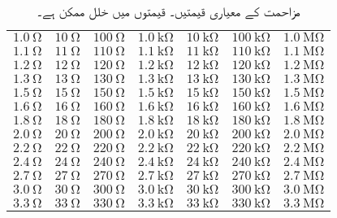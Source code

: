 \begin{table}
\caption{مزاحمت کے معیاری قیمتیں۔ قیمتوں میں  خلل ممکن ہے۔}
\centering
\begin{tabular}{l l l l l l l}
$\SI{1.0}{\ohm} $& $\SI{10}{\ohm}$ & $\SI{100}{\ohm}$ & $\SI{1.0}{\kilo\ohm}$ &$\SI{10}{\kilo\ohm} $& $\SI{100}{\kilo\ohm}$ & $\SI{1.0}{\mega\ohm}$\\
$\SI{1.1}{\ohm} $& $\SI{11}{\ohm}$ & $\SI{110}{\ohm}$ & $\SI{1.1}{\kilo\ohm}$ &$\SI{11}{\kilo\ohm} $& $\SI{110}{\kilo\ohm}$ & $\SI{1.1}{\mega\ohm}$\\
$\SI{1.2}{\ohm} $& $\SI{12}{\ohm}$ & $\SI{120}{\ohm}$ & $\SI{1.2}{\kilo\ohm}$ &$\SI{12}{\kilo\ohm} $& $\SI{120}{\kilo\ohm}$ & $\SI{1.2}{\mega\ohm}$\\
$\SI{1.3}{\ohm} $& $\SI{13}{\ohm}$ & $\SI{130}{\ohm}$ & $\SI{1.3}{\kilo\ohm}$ &$\SI{13}{\kilo\ohm} $& $\SI{130}{\kilo\ohm}$ & $\SI{1.3}{\mega\ohm}$\\
$\SI{1.5}{\ohm} $& $\SI{15}{\ohm}$ & $\SI{150}{\ohm}$ & $\SI{1.5}{\kilo\ohm}$ &$\SI{15}{\kilo\ohm} $& $\SI{150}{\kilo\ohm}$ & $\SI{1.5}{\mega\ohm}$\\
$\SI{1.6}{\ohm} $& $\SI{16}{\ohm}$ & $\SI{160}{\ohm}$ & $\SI{1.6}{\kilo\ohm}$ &$\SI{16}{\kilo\ohm} $& $\SI{160}{\kilo\ohm}$ & $\SI{1.6}{\mega\ohm}$\\
$\SI{1.8}{\ohm} $& $\SI{18}{\ohm}$ & $\SI{180}{\ohm}$ & $\SI{1.8}{\kilo\ohm}$ &$\SI{18}{\kilo\ohm} $& $\SI{180}{\kilo\ohm}$ & $\SI{1.8}{\mega\ohm}$\\
$\SI{2.0}{\ohm} $& $\SI{20}{\ohm}$ & $\SI{200}{\ohm}$ & $\SI{2.0}{\kilo\ohm}$ &$\SI{20}{\kilo\ohm} $& $\SI{200}{\kilo\ohm}$ & $\SI{2.0}{\mega\ohm}$\\
$\SI{2.2}{\ohm} $& $\SI{22}{\ohm}$ & $\SI{220}{\ohm}$ & $\SI{2.2}{\kilo\ohm}$ &$\SI{22}{\kilo\ohm} $& $\SI{220}{\kilo\ohm}$ & $\SI{2.2}{\mega\ohm}$\\
$\SI{2.4}{\ohm} $& $\SI{24}{\ohm}$ & $\SI{240}{\ohm}$ & $\SI{2.4}{\kilo\ohm}$ &$\SI{24}{\kilo\ohm} $& $\SI{240}{\kilo\ohm}$ & $\SI{2.4}{\mega\ohm}$\\
$\SI{2.7}{\ohm} $& $\SI{27}{\ohm}$ & $\SI{270}{\ohm}$ & $\SI{2.7}{\kilo\ohm}$ &$\SI{27}{\kilo\ohm} $& $\SI{270}{\kilo\ohm}$ & $\SI{2.7}{\mega\ohm}$\\
$\SI{3.0}{\ohm} $& $\SI{30}{\ohm}$ & $\SI{300}{\ohm}$ & $\SI{3.0}{\kilo\ohm}$ &$\SI{30}{\kilo\ohm} $& $\SI{300}{\kilo\ohm}$ & $\SI{3.0}{\mega\ohm}$\\
$\SI{3.3}{\ohm} $& $\SI{33}{\ohm}$ & $\SI{330}{\ohm}$ & $\SI{3.3}{\kilo\ohm}$ &$\SI{33}{\kilo\ohm} $& $\SI{330}{\kilo\ohm}$ & $\SI{3.3}{\mega\ohm}$\\

\end{tabular}
\end{table}
